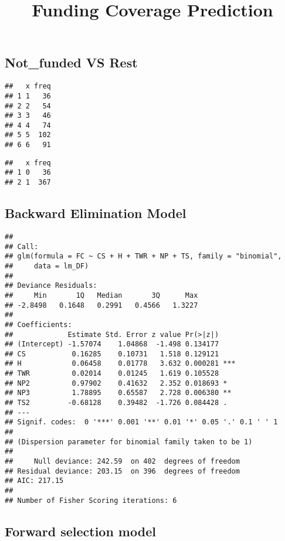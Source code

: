 \documentclass[]{article}
\title{Funding Coverage Prediction}
\author{}
\date{}
\begin{document}
\maketitle

\hypertarget{not_funded-vs-rest}{%
\subsection{Not\_funded VS Rest}\label{not_funded-vs-rest}}

\begin{verbatim}
##   x freq
## 1 1   36
## 2 2   54
## 3 3   46
## 4 4   74
## 5 5  102
## 6 6   91
\end{verbatim}

\begin{verbatim}
##   x freq
## 1 0   36
## 2 1  367
\end{verbatim}

\hypertarget{backward-elimination-model}{%
\subsection{Backward Elimination
Model}\label{backward-elimination-model}}

\begin{verbatim}
## 
## Call:
## glm(formula = FC ~ CS + H + TWR + NP + TS, family = "binomial", 
##     data = lm_DF)
## 
## Deviance Residuals: 
##     Min       1Q   Median       3Q      Max  
## -2.8498   0.1648   0.2991   0.4566   1.3227  
## 
## Coefficients:
##             Estimate Std. Error z value Pr(>|z|)    
## (Intercept) -1.57074    1.04868  -1.498 0.134177    
## CS           0.16285    0.10731   1.518 0.129121    
## H            0.06458    0.01778   3.632 0.000281 ***
## TWR          0.02014    0.01245   1.619 0.105528    
## NP2          0.97902    0.41632   2.352 0.018693 *  
## NP3          1.78895    0.65587   2.728 0.006380 ** 
## TS2         -0.68128    0.39482  -1.726 0.084428 .  
## ---
## Signif. codes:  0 '***' 0.001 '**' 0.01 '*' 0.05 '.' 0.1 ' ' 1
## 
## (Dispersion parameter for binomial family taken to be 1)
## 
##     Null deviance: 242.59  on 402  degrees of freedom
## Residual deviance: 203.15  on 396  degrees of freedom
## AIC: 217.15
## 
## Number of Fisher Scoring iterations: 6
\end{verbatim}

\hypertarget{forward-selection-model}{%
\subsection{Forward selection model}\label{forward-selection-model}}
\end{document}
